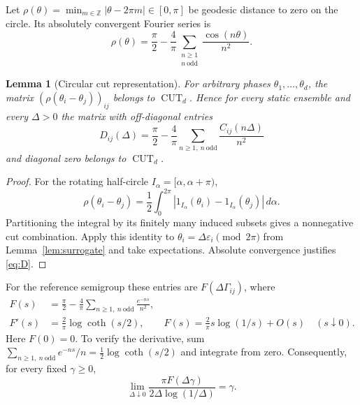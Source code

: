 \documentclass[11pt,a4paper]{article}
\newtheorem{lemma}[theorem]{Lemma}
\theoremstyle{remark}\newtheorem{remark}[theorem]{Remark}
\newcommand{\CUT}{\operatorname{CUT}}
\begin{document}
Let $\rho(\theta)=\min_{m\in\mathbb Z}|\theta-2\pi m|\in[0,\pi]$
be geodesic distance to zero on the circle. Its absolutely convergent
Fourier series is
\begin{equation}\label{eq:rho}
 \rho(\theta)=\frac\pi2-\frac4\pi
       \sum_{\substack{n\geq1\\n\ \mathrm{odd}}}\frac{\cos(n\theta)}{n^2}.
\end{equation}

\begin{lemma}[Circular cut representation]\label{lem:circle}
For arbitrary phases $\theta_1,\ldots,\theta_d$, the matrix
$(\rho(\theta_i-\theta_j))_{ij}$ belongs to $\CUT_d$. Hence for every
static ensemble and every $\Delta>0$ the matrix with off-diagonal entries
\begin{equation}\label{eq:D}
 D_{ij}(\Delta)=\frac\pi2-\frac4\pi
  \sum_{n\geq1,\ n\ \mathrm{odd}}\frac{C_{ij}(n\Delta)}{n^2}
\end{equation}
and diagonal zero belongs to $\CUT_d$.
\end{lemma}
\begin{proof}
For the rotating half-circle $I_\alpha=[\alpha,\alpha+\pi)$,
\[
 \rho(\theta_i-\theta_j)=\frac12\int_0^{2\pi}
  |1_{I_\alpha}(\theta_i)-1_{I_\alpha}(\theta_j)|\,d\alpha.
\]
Partitioning the integral by its finitely many induced subsets gives a
nonnegative cut combination. Apply this identity to
$\theta_i=\Delta\varepsilon_i\pmod{2\pi}$ from
Lemma~\ref{lem:surrogate} and take expectations.
Absolute convergence justifies \eqref{eq:D}.
\end{proof}

For the reference semigroup these entries are $F(\Delta\Gamma_{ij})$,
where
\begin{align}
 F(s)&=\frac\pi2-\frac4\pi\sum_{n\geq1,\ n\ \mathrm{odd}}
                          \frac{e^{-ns}}{n^2},\label{eq:F}\\
 F'(s)&=\frac2\pi\log\coth(s/2),\qquad
 F(s)=\frac2\pi s\log(1/s)+O(s)\quad(s\downarrow0).\label{eq:Fasym}
\end{align}
Here $F(0)=0$. To verify the derivative, sum
$\sum_{n\geq1,\ n\ \mathrm{odd}}e^{-ns}/n=\frac12\log\coth(s/2)$ and integrate
from zero. Consequently, for every fixed $\gamma\geq0$,
\begin{equation}\label{eq:ratelimit}
 \lim_{\Delta\downarrow0}\frac{\pi F(\Delta\gamma)}
                      {2\Delta\log(1/\Delta)}=\gamma.
\end{equation}
\end{document}
